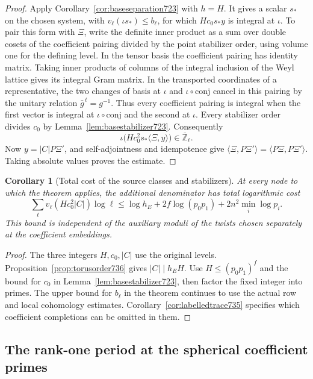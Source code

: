 \documentclass[a4paper,11pt]{article}
\newtheorem{corollary}[proposition]{Corollary}
\theoremstyle{definition}
\theoremstyle{remark}
\newcommand{\ZZ}{\mathbb Z}\newcommand{\ord}{\operatorname{ord}}
\numberwithin{equation}{section}
\begin{document}
\begin{proof}
Apply Corollary~\ref{cor:baseseparation723} with \(h=H\).
It gives a scalar \(s_*\) on the chosen system, with
\(v_\ell(\iota s_*)\le b_\ell\), for which
\(Hc_0s_* y\) is integral at \(\iota\). To pair this form with
\(\Xi\), write the definite inner product as a sum over double
cosets of the coefficient pairing divided by the point
stabilizer order, using volume one for the defining level.
In the tensor basis the coefficient pairing has identity matrix.
Taking inner products of columns of the integral inclusion
of the Weyl lattice gives its integral Gram matrix. In the transported
coordinates of a representative, the two changes of basis at
\(\iota\) and \(\iota\circ\mathrm{conj}\) cancel in this
pairing by the unitary relation \(\bar g^{\,t}=g^{-1}\).
Thus every coefficient pairing is integral when the first
vector is integral at \(\iota\circ\mathrm{conj}\) and the
second at \(\iota\). Every stabilizer order divides \(c_0\)
by Lemma~\ref{lem:basestabilizer723}. Consequently
\[
   \iota\bigl(Hc_0^2 s_* \langle\Xi,y\rangle\bigr)
                   \in\overline{\ZZ}_\ell .
\]
Now \(y=|C|P\Xi'\), and self-adjointness and idempotence give
\(\langle\Xi,P\Xi'\rangle=\langle P\Xi,P\Xi'\rangle\).
Taking absolute values proves the estimate.
\end{proof}

\begin{corollary}[Total cost of the source classes and stabilizers]
\leavevmode\label{cor:rankonefixed736}
At every node to which the theorem applies, the additional
denominator has total logarithmic cost
\[
 \sum_{\ell}v_\ell(Hc_0^2|C|)\log\ell
 \le \log h_E+2f\log(p_0p_1)+2n^2\min_i\log p_i .
\]
This bound is independent of the auxiliary moduli of the twists
chosen separately at the coefficient embeddings.
\end{corollary}
\begin{proof}
The three integers \(H,c_0,|C|\) use the original levels.
Proposition~\ref{prop:torusorder736} gives \(|C|\mid h_E H\).
Use \(H\le(p_0p_1)^f\) and the bound for \(c_0\) in
Lemma~\ref{lem:basestabilizer723}, then factor the fixed integer
into primes. The upper bound for \(b_\ell\) in the theorem
continues to use the actual row and local cohomology estimates.
Corollary~\ref{cor:labelledtrace735} specifies which coefficient
completions can be omitted in them.
\end{proof}
\clearpage

\subsection{The rank-one period at the spherical coefficient primes}
\label{sec:rankonespherical737}
\end{document}
